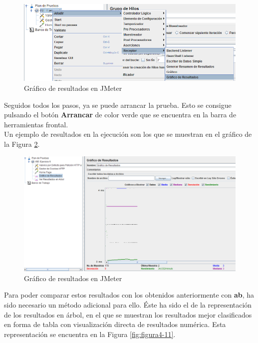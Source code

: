 \begin{figure}[H] %
	\centering
	\includegraphics[scale=0.7]{figuras/ejercicio4/figura4-9.png} 
	\caption{Gráfico de resultados en JMeter} 
	\label{fig:figura4-9}
\end{figure}

Seguidos todos los pasos, ya se puede arrancar la prueba. Esto se consigue pulsando el botón \textbf{Arrancar} de color verde que se encuentra en la barra de herramientas frontal. \\

Un ejemplo de resultados en la ejecución son los que se muestran en el gráfico de la Figura \ref{fig:figura4-10}.

\begin{figure}[H] %
	\centering
	\includegraphics[scale=0.5]{figuras/ejercicio4/figura4-10.png} 
	\caption{Gráfico de resultados en JMeter} 
	\label{fig:figura4-10}
\end{figure}

Para poder comparar estos resultados con los obtenidos anteriormente con \textbf{ab}, ha sido necesario un método adicional para ello. Éste ha sido el de la representación de los resultados en árbol, en el que se muestran los resultados mejor clasificados en forma de tabla con visualización directa de resultados numérica. Esta representación se encuentra en la Figura \ref{fig:figura4-11}.

